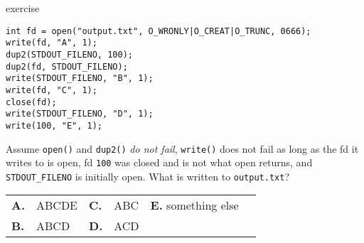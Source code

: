 \begin{frame}[fragile,label=ex]{exercise}
\begin{lstlisting}[style=small]
int fd = open("output.txt", O_WRONLY|O_CREAT|O_TRUNC, 0666);
write(fd, "A", 1);
dup2(STDOUT_FILENO, 100);
dup2(fd, STDOUT_FILENO);
write(STDOUT_FILENO, "B", 1);
write(fd, "C", 1);
close(fd);
write(STDOUT_FILENO, "D", 1);
write(100, "E", 1);
\end{lstlisting}
\small Assume \texttt{open()} and \texttt{dup2()} \textit{do not fail},
\texttt{write()} does not fail as long as the fd it writes to is open,
fd \texttt{100} was closed and is not what open returns, and \texttt{STDOUT\_FILENO} is initially open.
What is written to \texttt{output.txt}? \\
\begin{tabular}{llllll}
\textbf{A.} & ABCDE & \textbf{C.} & ABC & \textbf{E.} something else \\
\textbf{B.} & ABCD & \textbf{D.} & ACD \\
\end{tabular}
\end{frame}
